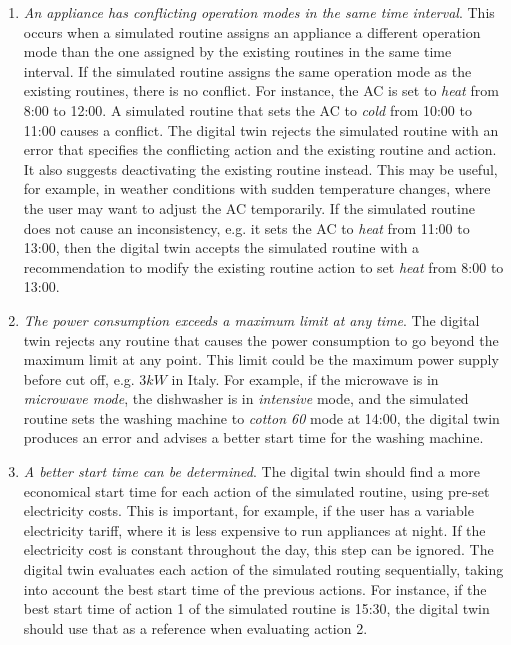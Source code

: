 \begin{enumerate}[label={\textit{S\arabic*.}}, leftmargin=3.5em]
    \item \textit{An appliance has conflicting operation modes in the same time interval}. This occurs when a simulated routine assigns an appliance a different operation mode than the one assigned by the existing routines in the same time interval. If the simulated routine assigns the same operation mode as the existing routines, there is no conflict. For instance, the AC is set to \textit{heat} from 8:00 to 12:00. A simulated routine that sets the AC to \textit{cold} from 10:00 to 11:00 causes a conflict. The digital twin rejects the simulated routine with an error that specifies the conflicting action and the existing routine and action. It also suggests deactivating the existing routine instead. This may be useful, for example, in weather conditions with sudden temperature changes, where the user may want to adjust the AC temporarily. If the simulated routine does not cause an inconsistency, e.g. it sets the AC to \textit{heat} from 11:00 to 13:00, then the digital twin accepts the simulated routine with a recommendation to modify the existing routine action to set \textit{heat} from 8:00 to 13:00.

    \item \textit{The power consumption exceeds a maximum limit at any time}. The digital twin rejects any routine that causes the power consumption to go beyond the maximum limit at any point. This limit could be the maximum power supply before cut off, e.g. $3kW$ in Italy. For example, if the microwave is in \textit{microwave mode}, the dishwasher is in \textit{intensive} mode, and the simulated routine sets the washing machine to \textit{cotton 60} mode at 14:00, the digital twin produces an error and advises a better start time for the washing machine.

    \item \textit{A better start time can be determined}. The digital twin should find a more economical start time for each action of the simulated routine, using pre-set electricity costs. This is important, for example, if the user has a variable electricity tariff, where it is less expensive to run appliances at night. If the electricity cost is constant throughout the day, this step can be ignored. The digital twin evaluates each action of the simulated routing sequentially, taking into account the best start time of the previous actions. For instance, if the best start time of action 1 of the simulated routine is 15:30, the digital twin should use that as a reference when evaluating action 2.


\end{enumerate}
